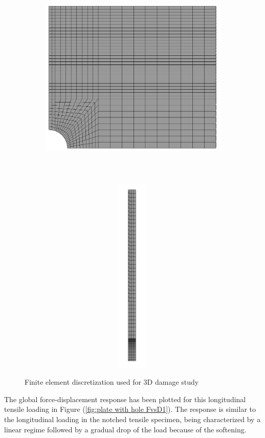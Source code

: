 \documentclass[12pt]{report}
\begin{document}
\begin{figure}[htbp!]
	\centering
       \captionsetup[subfigure]{justification=centering}
     \begin{subfigure}{0.5\textwidth}
     	\centering
         \includegraphics[width=10cm,height=10cm,keepaspectratio]{27.Mesh.png}
         \label{fig:plate with hole mesh 1}
     \end{subfigure}
    \hspace{2.5cm}
     \captionsetup[subfigure]{justification=centering}
     \begin{subfigure}{0.3\textwidth}
     \centering
         \includegraphics[width=9cm,height=9.5cm,keepaspectratio]{27.Mesh2.png}
         \label{fig:plate with hole mesh 2}
         \end{subfigure}
          \caption{Finite element discretization used for 3D damage study}
        \label{fig:plate with hole mesh} 
\end{figure}
\FloatBarrier 
\indent\indent\indent The global force-displacement response has been plotted for this longitudinal tensile loading in Figure (\ref{fig:plate with hole FvsD1}). The response is similar to the longitudinal loading in the notched tensile specimen, being characterized by a linear regime followed by a gradual drop of the load because of the softening.
 
\end{document}
